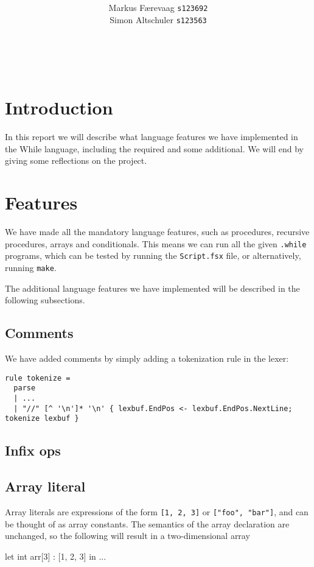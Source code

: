 \documentclass{article}
\title{\TITLE\\ {\large \COURSE}}
\date{\DATE}
\author{
  Markus Færevaag {\tt s123692}\\
  Simon Altschuler {\tt s123563}
}
\begin{document}
\maketitle
\vspace{10cm}
 \\
\clearpage


\section{Introduction}
In this report we will describe what language features we have
implemented in the While language, including the required and some
additional. We will end by giving some reflections on the
project.


\section{Features}
We have made all the mandatory language features, such as procedures,
recursive procedures, arrays and conditionals. This means we can run
all the given {\tt .while} programs, which can be tested by running
the {\tt Script.fsx} file, or alternatively, running {\tt make}.

The additional language features we have implemented will be described
in the following subsections.

\subsection{Comments}
We have added comments by simply adding a tokenization rule in the
lexer:
\begin{verbatim}
rule tokenize =
  parse
  | ...
  | "//" [^ '\n']* '\n' { lexbuf.EndPos <- lexbuf.EndPos.NextLine; tokenize lexbuf }
\end{verbatim}

\subsection{Infix ops}
\subsection{Array literal}
Array literals are expressions of the form {\tt [1, 2, 3]} or {\tt ["foo", "bar"]}, and can be thought of as array constants. The semantics of the array declaration are unchanged, so the following will result in a two-dimensional array
\begin{fs}
let int arr[3] : [1, 2, 3] in ...
\end{fs}
\end{document}
